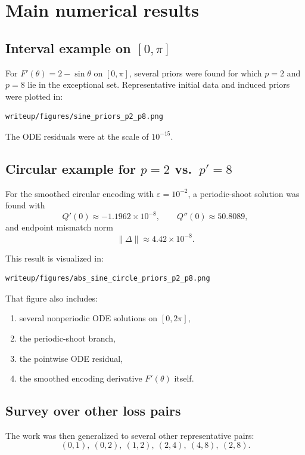 \documentclass[11pt]{article}
\begin{document}
\section{Main numerical results}

\subsection{Interval example on $[0,\pi]$}

For $F'(\theta)=2-\sin\theta$ on $[0,\pi]$, several priors were found for which $p=2$ and $p=8$ lie in the exceptional set. Representative initial data and induced priors were plotted in:
\begin{Verbatim}[fontsize=\small]
writeup/figures/sine_priors_p2_p8.png
\end{Verbatim}

The ODE residuals were at the scale of $10^{-15}$.

\subsection{Circular example for $p=2$ vs.\ $p'=8$}

For the smoothed circular encoding with $\varepsilon=10^{-2}$, a periodic-shoot solution was found with
\[
Q'(0) \approx -1.1962\times 10^{-8},
\qquad
Q''(0) \approx 50.8089,
\]
and endpoint mismatch norm
\[
\|\Delta\| \approx 4.42\times 10^{-8}.
\]

This result is visualized in:
\begin{Verbatim}[fontsize=\small]
writeup/figures/abs_sine_circle_priors_p2_p8.png
\end{Verbatim}

That figure also includes:
\begin{enumerate}
\item several nonperiodic ODE solutions on $[0,2\pi]$,
\item the periodic-shoot branch,
\item the pointwise ODE residual,
\item the smoothed encoding derivative $F'(\theta)$ itself.
\end{enumerate}

\subsection{Survey over other loss pairs}

The work was then generalized to several other representative pairs:
\[
(0,1),\ (0,2),\ (1,2),\ (2,4),\ (4,8),\ (2,8).
\]
\end{document}
